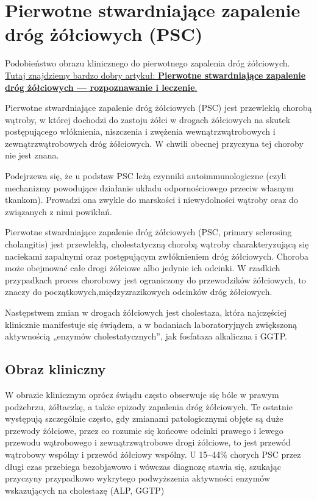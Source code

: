 
\chapter{Pierwotne stwardniające zapalenie dróg żółciowych (PSC)}

Podobieństwo obrazu klinicznego do pierwotnego zapalenia dróg żółciowych.
\href{https://journals.viamedica.pl/gastroenterologia_kliniczna/article/viewFile/29305/24057}{Tutaj znajdziemy bardzo dobry artykuł: \textbf{Pierwotne stwardniające zapalenie dróg żółciowych — rozpoznawanie i leczenie}.}


Pierwotne stwardniające zapalenie dróg żółciowych (PSC) jest przewlekłą chorobą wątroby, w której dochodzi do zastoju żółci w drogach żółciowych na skutek postępującego włóknienia, niszczenia i zwężenia wewnątrzwątrobowych i zewnątrzwątrobowych dróg żółciowych. 
W chwili obecnej przyczyna tej choroby nie jest znana. 

Podejrzewa się, że u podstaw PSC leżą czynniki autoimmunologiczne (czyli mechanizmy powodujące działanie układu odpornościowego przeciw własnym tkankom). 
Prowadzi ona zwykle do marskości i niewydolności wątroby oraz do związanych z nimi powikłań.

Pierwotne stwardniające zapalenie dróg żółciowych (PSC, primary sclerosing cholangitis)  jest  przewlekłą,  cholestatyczną  chorobą wątroby charakteryzującą się naciekami zapalnymi  oraz  postępującym  zwłóknieniem  dróg  żółciowych.  
Choroba  może obejmować całe drogi żółciowe albo jedynie ich odcinki. 
W rzadkich przypadkach proces chorobowy  jest  ograniczony  do  przewodzików żółciowych, to znaczy do początkowych,międzyzrazikowych  odcinków  dróg  żółciowych.

Następstwem zmian w drogach żółciowych jest  cholestaza,  która  najczęściej  klinicznie manifestuje się świądem, a w badaniach laboratoryjnych zwiększoną aktywnością „enzymów cholestatycznych”,  jak  fosfataza  alkaliczna i  GGTP.  

\section{Obraz kliniczny}

W  obrazie  klinicznym  oprócz świądu  często  obserwuje  się  bóle  w  prawym podżebrzu,  żółtaczkę,  a  także  epizody  zapalenia  dróg  żółciowych.  
Te  ostatnie  występują szczególnie często, gdy zmianami patologicznymi objęte są duże przewody żółciowe, przez co rozumie  się  końcowe  odcinki  prawego  i  lewego przewodu wątrobowego i zewnątrzwątrobowe drogi żółciowe, to jest przewód wątrobowy wspólny  i  przewód  żółciowy  wspólny.
U 15–44\% chorych PSC przez długi czas przebiega bezobjawowo i wówczas diagnozę stawia się, szukając przyczyny przypadkowo wykrytego podwyższenia aktywności enzymów wskazujących na cholestazę (ALP, GGTP)

